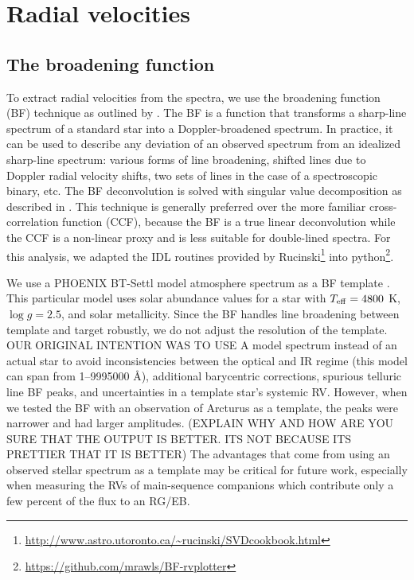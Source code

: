 \section{Radial velocities}\label{rvs}
\subsection{The broadening function}\label{bf}
To extract radial velocities from the spectra, we use the broadening function (BF) technique as outlined by \citet{ruc02}. The BF is a function that transforms a sharp-line spectrum of a standard star into a Doppler-broadened spectrum. In practice, it can be used to describe any deviation of an observed spectrum from an idealized sharp-line spectrum: various forms of line broadening, shifted lines due to Doppler radial velocity shifts, two sets of lines in the case of a spectroscopic binary, etc. The BF deconvolution is solved with singular value decomposition as described in \citet{ruc02}. This technique is generally preferred over the more familiar cross-correlation function (CCF), because the BF is a true linear deconvolution while the CCF is a non-linear proxy and is less suitable for double-lined spectra. For this analysis, we adapted the IDL routines provided by Rucinski\footnote{\url{http://www.astro.utoronto.ca/~rucinski/SVDcookbook.html}} into python\footnote{\url{https://github.com/mrawls/BF-rvplotter}}.

We use a PHOENIX BT-Settl model atmosphere spectrum as a BF template \citep{all03}. This particular model uses \citet{Asplund_2009} solar abundance values for a star with $T_{\rm{eff}} = 4800$ K, $\log g = 2.5$, and solar metallicity. Since the BF handles line broadening between template and target robustly, we do not adjust the resolution of the template. OUR ORIGINAL INTENTION WAS TO USE A model spectrum instead of an actual star to avoid inconsistencies between the optical and IR regime (this model can span from 1--9995000 \AA), additional barycentric corrections, spurious telluric line BF peaks, and uncertainties in a template star's systemic RV. However, when we tested the BF with an observation of Arcturus as a template, the peaks were narrower and had larger amplitudes. (EXPLAIN WHY AND HOW ARE YOU SURE THAT THE OUTPUT IS BETTER. ITS NOT BECAUSE ITS PRETTIER THAT IT IS BETTER) The advantages that come from using an observed stellar spectrum as a template may be critical for future work, especially when measuring the RVs of main-sequence companions which contribute only a few percent of the flux to an RG/EB.

